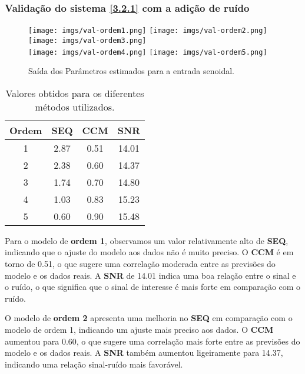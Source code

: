 \documentclass[a4paper,12pt]{article}
\begin{document}
\subsubsection{Validação do sistema \ref{3.2.1} com a adição de ruído}

\begin{figure}[h!]
\centering

\texttt{[image: imgs/val-ordem1.png]} \quad
\texttt{[image: imgs/val-ordem2.png]} \quad
\texttt{[image: imgs/val-ordem3.png]} \\

\texttt{[image: imgs/val-ordem4.png]} \quad
\texttt{[image: imgs/val-ordem5.png]}

\caption{Saída dos Parâmetros estimados para a entrada senoidal.} \label{fig6}
\end{figure}

\begin{table}[h!]
    \centering
    \begin{tabular}{|c|c|c|c|}
        \hline
        \textbf{Ordem} & \textbf{SEQ} & \textbf{CCM} & \textbf{SNR} \\
        \hline
        1 & 2.87 & 0.51 & 14.01 \\ 
        2 & 2.38 & 0.60 & 14.37 \\ 
        3 & 1.74 & 0.70 & 14.80 \\ 
        4 & 1.03 & 0.83 & 15.23 \\ 
        5 & 0.60 & 0.90 & 15.48 \\ 
        \hline
    \end{tabular}
    \caption{Valores obtidos para os diferentes métodos utilizados.}
\end{table}

Para o modelo de \textbf{ordem 1}, observamos um valor relativamente alto de \textbf{SEQ}, indicando que o ajuste do modelo aos dados não é muito preciso. O \textbf{CCM} é em torno de 0.51, o que sugere uma correlação moderada entre as previsões do modelo e os dados reais. A \textbf{SNR} de 14.01 indica uma boa relação entre o sinal e o ruído, o que significa que o sinal de interesse é mais forte em comparação com o ruído.

O modelo de \textbf{ordem 2} apresenta uma melhoria no \textbf{SEQ} em comparação com o modelo de ordem 1, indicando um ajuste mais preciso aos dados. O \textbf{CCM} aumentou para 0.60, o que sugere uma correlação mais forte entre as previsões do modelo e os dados reais. A \textbf{SNR} também aumentou ligeiramente para 14.37, indicando uma relação sinal-ruído mais favorável.
\end{document}
